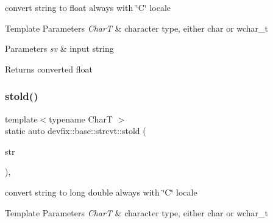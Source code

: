 convert string to float always with \char`\"{}\+C\char`\"{} locale 


\begin{DoxyTemplParams}{Template Parameters}
{\em CharT} & character type, either \textquotesingle{}char\textquotesingle{} or \textquotesingle{}wchar\+\_\+t\textquotesingle{} \\
\hline
\end{DoxyTemplParams}

\begin{DoxyParams}{Parameters}
{\em sv} & input string \\
\hline
\end{DoxyParams}
\begin{DoxyReturn}{Returns}
converted float 
\end{DoxyReturn}
\mbox{\label{structdevfix_1_1base_1_1strcvt_a387c5ad278f568abb921df0ebac489c3}} 
\subsubsection{\texorpdfstring{stold()}{stold()}\hspace{0.1cm}{\footnotesize\ttfamily [1/2]}}
{\footnotesize\ttfamily template$<$typename CharT $>$ \\
static auto devfix\+::base\+::strcvt\+::stold (\begin{DoxyParamCaption}\item[{const std\+::basic\+\_\+string$<$ CharT $>$ \&}]{str }\end{DoxyParamCaption})\hspace{0.3cm}{\ttfamily [inline]}, {\ttfamily [static]}}



convert string to long double always with \char`\"{}\+C\char`\"{} locale 


\begin{DoxyTemplParams}{Template Parameters}
{\em CharT} & character type, either \textquotesingle{}char\textquotesingle{} or \textquotesingle{}wchar\+\_\+t\textquotesingle{} \\
\hline
\end{DoxyTemplParams}

